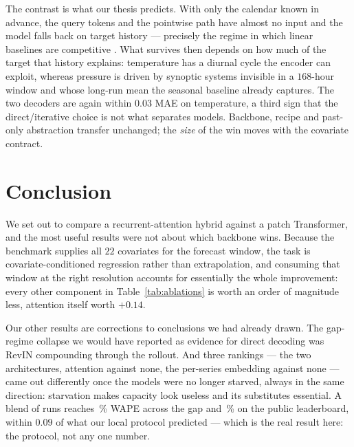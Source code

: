 \documentclass[10pt,twocolumn]{article}
\begin{document}
The contrast is what our thesis predicts. With only the calendar known in advance,
the query tokens and the pointwise path have almost no input and the model falls
back on target history --- precisely the regime in which linear baselines are
competitive \cite{zeng2023dlinear}. What survives then depends on how much of the
target that history explains: temperature has a diurnal cycle the encoder can
exploit, whereas pressure is driven by synoptic systems invisible in a $168$-hour
window and whose long-run mean the seasonal baseline already captures. The two
decoders are again within $0.03$ MAE on temperature, a third sign that the
direct/iterative choice is not what separates models. Backbone, recipe and
past-only abstraction transfer unchanged; the \emph{size} of the win moves with the
covariate contract.

\section{Conclusion}

We set out to compare a recurrent-attention hybrid against a patch Transformer, and
the most useful results were not about which backbone wins. Because the benchmark
supplies all $22$ covariates for the forecast window, the task is
covariate-conditioned regression rather than extrapolation, and consuming that
window at the right resolution accounts for essentially the whole improvement:
every other component in Table~\ref{tab:ablations} is worth an order of magnitude
less, attention itself worth $+0.14$.

Our other results are corrections to conclusions we had already drawn. The
gap-regime collapse we would have reported as evidence for direct decoding was
RevIN compounding through the rollout. And three rankings --- the two architectures,
attention against none, the per-series embedding against none --- came out
differently once the models were no longer starved, always in the same direction:
starvation makes capacity look useless and its substitutes essential. A blend of
\ensMembers{} runs reaches \ensTestWape\,\% WAPE across the gap and
\ensPublicWape\,\% on the public leaderboard, within $0.09$ of what our local
protocol predicted --- which is the real result here: the protocol, not any one
number.
\end{document}
